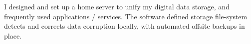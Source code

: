 \descript{ }
\vspace*{-\topsep}  %
\begin{justify}
I designed and set up a home server to unify my digital data storage, and frequently used applications / services.
The software defined storage file-system detects and corrects data corruption locally, with automated offsite backups in place.
\end{justify}
